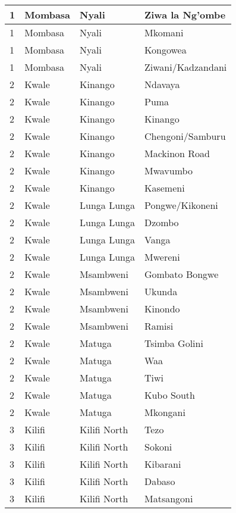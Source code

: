 \begin{table}[!ht]
\begin{tabular}{|l|l|l|l|}
        1 & Mombasa & Nyali & Ziwa la Ng’ombe \\ \hline
        1 & Mombasa & Nyali & Mkomani \\ \hline
        1 & Mombasa & Nyali & Kongowea \\ \hline
        1 & Mombasa & Nyali & Ziwani/Kadzandani \\ \hline
        2 & Kwale & Kinango & Ndavaya \\ \hline
        2 & Kwale & Kinango & Puma \\ \hline
        2 & Kwale & Kinango & Kinango \\ \hline
        2 & Kwale & Kinango & Chengoni/Samburu \\ \hline
        2 & Kwale & Kinango & Mackinon Road \\ \hline
        2 & Kwale & Kinango & Mwavumbo \\ \hline
        2 & Kwale & Kinango & Kasemeni \\ \hline
        2 & Kwale & Lunga Lunga & Pongwe/Kikoneni \\ \hline
        2 & Kwale & Lunga Lunga & Dzombo \\ \hline
        2 & Kwale & Lunga Lunga & Vanga \\ \hline
        2 & Kwale & Lunga Lunga & Mwereni \\ \hline
        2 & Kwale & Msambweni & Gombato Bongwe \\ \hline
        2 & Kwale & Msambweni & Ukunda \\ \hline
        2 & Kwale & Msambweni & Kinondo \\ \hline
        2 & Kwale & Msambweni & Ramisi \\ \hline
        2 & Kwale & Matuga & Tsimba Golini \\ \hline
        2 & Kwale & Matuga & Waa \\ \hline
        2 & Kwale & Matuga & Tiwi \\ \hline
        2 & Kwale & Matuga & Kubo South \\ \hline
        2 & Kwale & Matuga & Mkongani \\ \hline
        3 & Kilifi & Kilifi North & Tezo \\ \hline
        3 & Kilifi & Kilifi North & Sokoni \\ \hline
        3 & Kilifi & Kilifi North & Kibarani \\ \hline
        3 & Kilifi & Kilifi North & Dabaso \\ \hline
        3 & Kilifi & Kilifi North & Matsangoni \\ \hline

\end{tabular}
\end{table}
